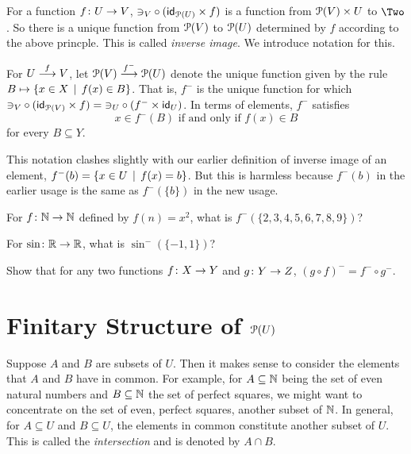 For a function $\fromto fUV$, ${\mathord\ni}_V\circ (\id_{\powerset(U)}\times f)$ is a function from $\powerset(V)\times U$ to $\Two$.
So there is a unique function from $\powerset(V)$ to $\powerset(U)$ determined by $f$ according to the above princple.
This is called \emph{inverse image}. We introduce notation for this.

\begin{defn}
	For $\sfromto fUV$, let $\sfromto {f^-}{\powerset(V)}{\powerset(U)}$ denote
	the unique function given by the rule $B\mapsto \{x\in X\st f(x)\in B\}$.
	That is, $f^-$ is the unique function for which ${\mathord\ni}_V\circ (\id_{\powerset(V)}\times f) = {\mathord\ni}_U\circ(f^-\times \id_U)$. 
	In terms of elements, $f^-$ satisfies
	\[x\in f^-(B) \text{ if and only if } f(x)\in B\]
	for every $B\subseteq Y$.
\end{defn}

This notation clashes slightly with our earlier definition of inverse image of an element, $f^-(b) = \{x\in U\st f(x)=b\}$. But this is harmless because 
$f^-(b)$ in the earlier usage is the same as $f^-(\{b\})$ in the new usage.

\begin{exercises}
	\begin{firstexercise}
		\item For $\fromto f\NN\NN$ defined by $f(n) = x^2$, what is $f^-(\{2,3,4,5,6,7,8,9\})$?
		\item For $\fromto \sin\RR\RR$, what is $\sin^-(\{-1,1\})$?
		\item Show that for any two functions $\fromto fXY$ and $\fromto gYZ$, $(g\circ f)^- = f^-\circ g^-$.
	\end{firstexercise}
\end{exercises}

\section{Finitary Structure of $\powerset(U)$}

Suppose $A$ and $B$ are subsets of $U$. 
Then it makes sense to consider the elements that $A$ and $B$ have in common. 
For example, for $A\subseteq \NN$ being the set of even natural numbers and $B\subseteq \NN$ the set of perfect squares, we might want to concentrate on the set of even, perfect squares, another subset of $\NN$.
In general, for $A\subseteq U$ and $B\subseteq U$, the elements in common constitute another subset of $U$.
This is called the \emph{intersection} and is denoted by $A\cap B$.

